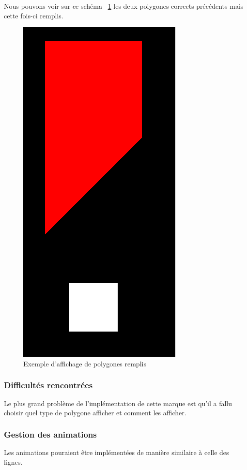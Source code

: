 \documentclass[12pt]{article}
\begin{document}
Nous pouvons voir sur ce schéma ~\ref{fig:capture_polygon_fill} les deux polygones corrects précédents mais cette fois-ci remplis.
\begin{figure}[htp]
  \centering
  \includegraphics[scale=0.5]{images/polygon_fill}
  \caption{Exemple d'affichage de polygones remplis}
  \label{fig:capture_polygon_fill}
\end{figure}

\subsubsection{Difficultés rencontrées}
Le plus grand problème de l'implémentation de cette marque est qu'il a fallu choisir quel type
de polygone afficher et comment les afficher.

\subsubsection{Gestion des animations}
Les animations pouraient être implémentées de manière similaire à celle des lignes.
\end{document}
